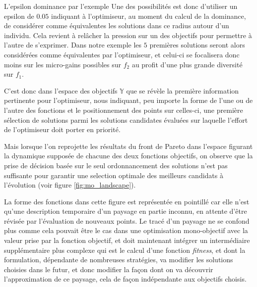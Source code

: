 \begin{testiv}{L'epsilon dominance par l'exemple}{}
Une des possibilités est donc d'utiliser un epsilon de $0.05$ indiquant à l'optimiseur, au moment du calcul de la dominance, de considérer comme équivalentes les solutions dans ce radius autour d'un individu. Cela revient à relâcher la pression sur un des objectifs pour permettre à l'autre de s'exprimer. Dans notre exemple les $5$ premières solutions seront alors considérées comme équivalentes par l'optimiseur, et celui-ci se focalisera donc moins sur les micro-gains possibles sur $f_{2}$ au profit d'une plus grande diversité sur $f_{1}$.

\end{testiv}

C'est donc dans l'espace des objectifs $\mathbb{Y}$ que se révèle la première information pertinente pour l'optimiseur, nous indiquant, peu importe la forme de l'une ou de l'autre des fonctions et le positionnement des points sur celles-ci, une première sélection de solutions parmi les solutions candidates évaluées sur laquelle l'effort de l'optimiseur doit porter en priorité.

Mais lorsque l'on reprojette les résultats du front de Pareto dans l'espace figurant la dynamique supposée de chacune des deux fonctions objectifs, on observe que la prise de décision basée sur le seul ordonnancement des solutions n'est pas suffisante pour garantir une selection optimale des meilleurs candidats à l'évolution (voir figure \ref{fig:mo_landscape}).

La forme des fonctions dans cette figure est représentée en pointillé car elle n'est qu'une description temporaire d'un paysage en partie inconnu, en attente d'être révisée par l'évaluation de nouveaux points. Le tracé d'un paysage ne se confond plus comme cela pouvait être le cas dans une optimisation mono-objectif avec la valeur prise par la fonction objectif, et doit maintenant intégrer un intermédiaire supplémentaire plus complexe qui est le calcul d'une fonction \textit{fitness}, et dont la formulation, dépendante de nombreuses stratégies, va modifier les solutions choisies dans le futur, et donc modifier la façon dont on va découvrir l'approximation de ce paysage, cela de façon indépendante aux objectifs choisis. \autocite{Weise2011}

